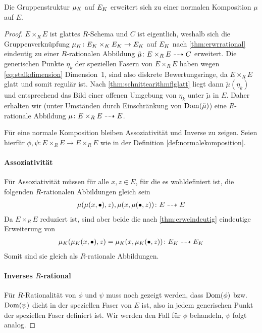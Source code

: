 \begin{Lemma}
  Die Gruppenstruktur $\mu_{K}$ auf $E_{K}$ erweitert sich zu einer
  normalen Komposition $\mu$ auf $E$.
  \begin{proof}
    $E\times_R E$ ist glattes $R$-Schema und $C$ ist eigentlich,
    weshalb sich die Gruppenverknüpfung $\mu_{K}\colon E_{K}\times_{K}
    E_{K}\to E_{K}$ auf $E_{K}$ nach \ref{thm:erwrrational} eindeutig zu
    einer $R$-rationalen Abbildung $\tilde\mu\colon E\times_R E\dashrightarrow C$
    erweitert.
    Die generischen Punkte $\eta_k$ der speziellen Fasern von
    $E\times_R E$ haben wegen \autoref{eq:stalkdimension}
    Dimension~1, sind also diskrete Bewertungsringe, da
    $E\times_R E$ glatt und somit regulär ist. Nach
    \ref{thm:schnittearithmflglatt} liegt dann
    $\tilde\mu(\eta_k)$ und entsprechend das Bild einer offenen
    Umgebung von $\eta_k$ unter $\tilde\mu$ in $E$. Daher erhalten
    wir (unter Umständen durch Einschränkung von $\operatorname{Dom}(\tilde\mu)$)
    eine $R$-rationale Abbildung $\mu\colon E\times_R E\dashrightarrow E$.

    Für eine normale Komposition bleiben Assoziativität und Inverse zu
    zeigen. Seien hierfür $\phi,\psi\colon E\times_R E\to E\times_R E$
    wie in der Definition \ref{def:normalekomposition}.

    \paragraph{Assoziativität}
    Für Assoziativität müssen für alle $x, z\in E$, für die es
    wohldefiniert ist, die folgenden $R$-rationalen 
    Abbildungen gleich sein
    \begin{gather*}
      \mu(\mu(x,\bullet),z), \mu(x,\mu(\bullet,z))
      \colon E \dashrightarrow E
    \end{gather*}
    Da $E\times_R E$ reduziert ist, sind aber beide die nach
    \ref{thm:erweindeutig} eindeutige Erweiterung von
    \begin{gather*}
      \mu_{K}(\mu_{K}(x,\bullet),z)=\mu_{K}(x,\mu_{K}(\bullet,z))
      \colon E_{K} \dashrightarrow E_{K}
    \end{gather*}
    Somit sind sie gleich als $R$-rationale Abbildungen.
    
    \paragraph{Inverses $R$-rational}
    Für $R$-Rationalität von $\phi$ und $\psi$ muss noch gezeigt
    werden, dass $\operatorname{Dom}(\phi)$ bzw. $\operatorname{Dom}(\psi)$ dicht in der
    speziellen Faser von $E$ ist, also in jedem generischen Punkt
    der speziellen Faser definiert ist.
    Wir werden den Fall für $\phi$ behandeln, $\psi$ folgt analog.
    

\end{proof}
\end{Lemma}
